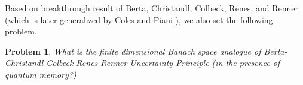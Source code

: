 \documentclass{amsart}
\newtheorem{problem}[theorem]{Problem}
\begin{document}
Based on  breakthrough result of Berta, Christandl, Colbeck, Renes, and Renner \cite{BERTACHRISTANDLCOLBECKRENESRENNER, BERTACHRISTANDLCOLBECKRENESRENNER2} (which is later generalized by Coles and Piani \cite{COLESPIANI}), we also  set the following problem. 
\begin{problem}
What is the finite dimensional Banach space analogue of Berta-Christandl-Colbeck-Renes-Renner Uncertainty Principle (in the presence of quantum memory?)
\end{problem}




 
 
 
\end{document}
